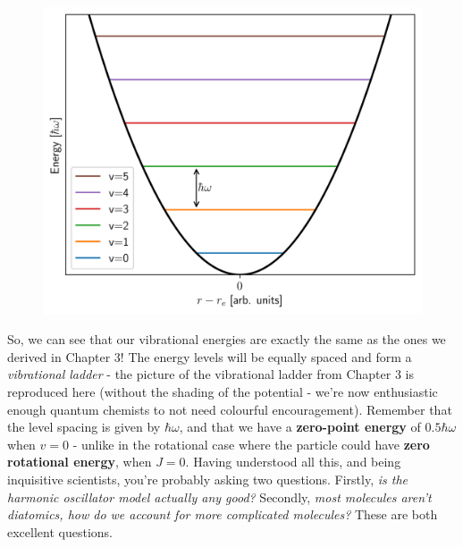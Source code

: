 \documentclass{memoir}[11pt,oneside,a4paper,openany]
\begin{document}
\begin{figure}
	\centering
	\includegraphics[width=\linewidth]{harmonic_oscillator_energies_gina}
\end{figure}
So, we can see that our vibrational energies are exactly the same as the ones we derived in Chapter 3! The energy levels will be equally spaced and form a \emph{vibrational ladder} - the picture of the vibrational ladder from Chapter 3 is reproduced here (without the shading of the potential - we're now enthusiastic enough quantum chemists to not need colourful encouragement). Remember that the level spacing is given by $\hbar\omega$, and that we have a \textbf{zero-point energy} of $0.5\hbar\omega$ when $v=0$ - unlike in the rotational case where the particle could have \textbf{zero rotational energy}, when $J=0$. Having understood all this, and being inquisitive scientists, you're probably asking two questions. Firstly, \emph{is the harmonic oscillator model actually any good?} Secondly, \emph{most molecules aren't diatomics, how do we account for more complicated molecules?} These are both excellent questions.    
\end{document}
